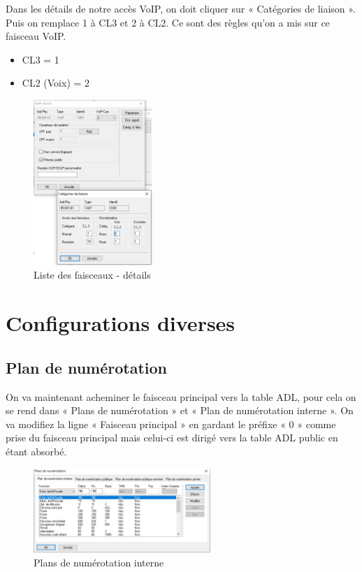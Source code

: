 \documentclass[12pt, a4paper]{article}
\begin{document}
Dans les détails de notre accès VoIP, on doit cliquer sur « Catégories de liaison ».
Puis on remplace 1 à CL3 et 2 à CL2. Ce sont des règles qu’on a mis sur ce faisceau VoIP. \\

\begin{itemize}
	\item CL3 = 1
	\item CL2 (Voix) = 2
\end{itemize}

\begin{figure}[H]
	\centering
	\includegraphics[width=0.4\textwidth]{img/fsd.png}
	\caption{Liste des faisceaux - détails}
	\label{fig:fsd}
\end{figure}

\section{Configurations diverses}

	\subsection{Plan de numérotation}

	On va maintenant acheminer le faisceau principal vers la table ADL, pour
	cela on se rend dans « Plans de numérotation » et « Plan de numérotation interne ».
	On va modifiez la ligne « Faisceau principal » en gardant le préfixe « 0 » comme prise
	du faisceau principal mais celui-ci est dirigé vers la table ADL public en étant absorbé.

	\begin{figure}[H]
		\centering
		\includegraphics[width=0.6\textwidth]{img/interne.png}
		\caption{Plans de numérotation interne}
		\label{fig:interne}
	\end{figure}
\end{document}
